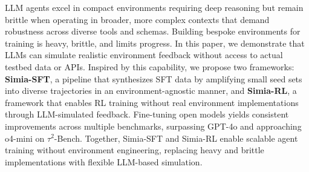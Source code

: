 





LLM agents excel in compact environments requiring deep reasoning but remain brittle when operating in broader, more complex contexts that demand robustness across diverse tools and schemas. Building bespoke environments for training is heavy, brittle, and limits progress. In this paper, we demonstrate that LLMs can simulate realistic environment feedback without access to actual testbed data or APIs. Inspired by this capability, we propose two frameworks: \textbf{Simia-SFT}, a pipeline that synthesizes SFT data by amplifying small seed sets into diverse trajectories in an environment-agnostic manner, and \textbf{Simia-RL}, a framework that enables RL training without real environment implementations through LLM-simulated feedback. Fine-tuning open models yields consistent improvements across multiple benchmarks, surpassing GPT-4o and approaching o4-mini on $\tau^2$-Bench. Together, Simia-SFT and Simia-RL enable scalable agent training without environment engineering, replacing heavy and brittle implementations with flexible LLM-based simulation.

